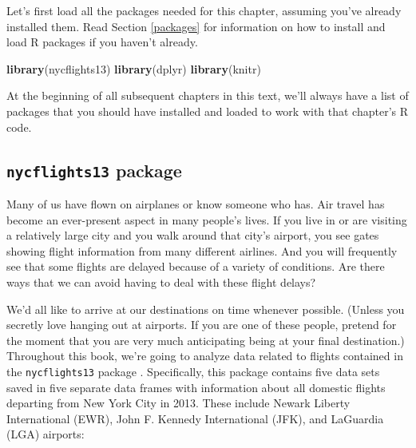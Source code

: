 \documentclass[12pt, krantz2,]{krantz}
\makeatletter
\newenvironment{Shaded}{\begin{snugshade}}{\end{snugshade}}
\newcommand{\KeywordTok}[1]{\textcolor[rgb]{0.27,0.27,0.27}{\textbf{#1}}}
\newcommand{\NormalTok}[1]{#1}
\newenvironment{kframe}{%
\medskip{}
\setlength{\fboxsep}{.8em}
 \def\at@end@of@kframe{}%
 \ifinner\ifhmode%
  \def\at@end@of@kframe{\end{minipage}}%
  \begin{minipage}{\columnwidth}%
 \fi\fi%
 \def\FrameCommand##1{\hskip\@totalleftmargin \hskip-\fboxsep
 \colorbox{shadecolor}{##1}\hskip-\fboxsep
     \hskip-\linewidth \hskip-\@totalleftmargin \hskip\columnwidth}%
 \MakeFramed {\advance\hsize-\width
   \@totalleftmargin\z@ \linewidth\hsize
   \@setminipage}}%
 {\par\unskip\endMakeFramed%
 \at@end@of@kframe}
\renewenvironment{Shaded}{\begin{kframe}}{\end{kframe}}
\makeatother
\begin{document}
Let's first load all the packages needed for this chapter, assuming you've already installed them. Read Section \ref{packages} for information on how to install and load R packages if you haven't already.

\begin{Shaded}
\begin{Highlighting}[]
\KeywordTok{library}\NormalTok{(nycflights13)}
\KeywordTok{library}\NormalTok{(dplyr)}
\KeywordTok{library}\NormalTok{(knitr)}
\end{Highlighting}
\end{Shaded}

At the beginning of all subsequent chapters in this text, we'll always have a list of packages that you should have installed and loaded to work with that chapter's R code.

\hypertarget{nycflights13-package}{%
\subsection{\texorpdfstring{\texttt{nycflights13} package}{nycflights13 package}}\label{nycflights13-package}}

Many of us have flown on airplanes or know someone who has. Air travel has become an ever-present aspect in many people's lives. If you live in or are visiting a relatively large city and you walk around that city's airport, you see gates showing flight information from many different airlines. And you will frequently see that some flights are delayed because of a variety of conditions. Are there ways that we can avoid having to deal with these flight delays?

We'd all like to arrive at our destinations on time whenever possible. (Unless you secretly love hanging out at airports. If you are one of these people, pretend for the moment that you are very much anticipating being at your final destination.) Throughout this book, we're going to analyze data related to flights contained in the \texttt{nycflights13} package \citep{R-nycflights13}. Specifically, this package contains five data sets saved in five separate data frames with information about all domestic flights departing from New York City in 2013. These include Newark Liberty International (EWR), John F. Kennedy International (JFK), and LaGuardia (LGA) airports:
\end{document}
